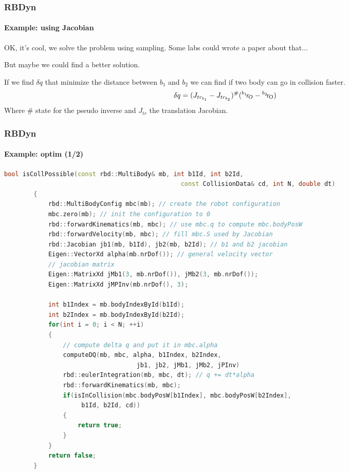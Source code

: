 \documentclass{beamer}
\begin{document}
\begin{frame}
	\frametitle{RBDyn}
	\framesubtitle{Example: using Jacobian}
	OK, it's cool, we solve the problem using sampling.
	Some labs could wrote a paper about that...
	\\ \hfill

	But maybe we could find a better solution.
	\\ \hfill

	If we find $ \delta q $ that minimize the distance between $ b_1 $ and $ b_2 $
	we can find if two body can go in collision faster.
	$$
	\delta q = (J_{tr_{b_1}} - J_{tr_{b_2}})^{\#} (\translation{O}{{b_1}} - \translation{O}{{b_2}})
	$$
	Where $ \# $ state for the pseudo inverse and $ J_{tr} $ the translation Jacobian.
\end{frame}
\begin{frame}[fragile]
	\frametitle{RBDyn}
	\framesubtitle{Example: optim (1/2)}
	\begin{lstlisting}[language=C++,basicstyle=\tiny]
		bool isCollPossible(const rbd::MultiBody& mb, int b1Id, int b2Id,
												const CollisionData& cd, int N, double dt)
		{
			rbd::MultiBodyConfig mbc(mb); // create the robot configuration
			mbc.zero(mb); // init the configuration to 0
			rbd::forwardKinematics(mb, mbc); // use mbc.q to compute mbc.bodyPosW
			rbd::forwardVelocity(mb, mbc); // fill mbc.S used by Jacobian
			rbd::Jacobian jb1(mb, b1Id), jb2(mb, b2Id); // b1 and b2 jacobian
			Eigen::VectorXd alpha(mb.nrDof()); // general velocity vector
			// jacobian matrix
			Eigen::MatrixXd jMb1(3, mb.nrDof()), jMb2(3, mb.nrDof());
			Eigen::MatrixXd jMPInv(mb.nrDof(), 3);

			int b1Index = mb.bodyIndexById(b1Id);
			int b2Index = mb.bodyIndexById(b2Id);
			for(int i = 0; i < N; ++i)
			{
				// compute delta q and put it in mbc.alpha
				computeDQ(mb, mbc, alpha, b1Index, b2Index,
									jb1, jb2, jMb1, jMb2, jPInv)
				rbd::eulerIntegration(mb, mbc, dt); // q += dt*alpha
				rbd::forwardKinematics(mb, mbc);
				if(isInCollision(mbc.bodyPosW[b1Index], mbc.bodyPosW[b2Index],
					 b1Id, b2Id, cd))
				{
					return true;
				}
			}
			return false;
		}
	\end{lstlisting}
\end{frame}
\end{document}
